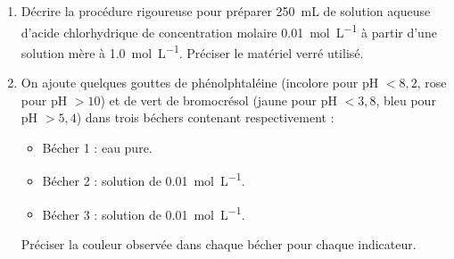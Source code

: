 \documentclass[11pt]{article}
\begin{document}
\begin{exercice}
\begin{enumerate}
    \item Décrire la procédure rigoureuse pour préparer \SI{250}{\milli\liter} de solution aqueuse d'acide chlorhydrique de concentration molaire \SI{0,01}{\mol\per\liter} à partir d'une solution mère à \SI{1,0}{\mol\per\liter}. Préciser le matériel verré utilisé.
    \item On ajoute quelques gouttes de phénolphtaléine (incolore pour pH $< 8,2$, rose pour pH $> 10$) et de vert de bromocrésol (jaune pour pH $< 3,8$, bleu pour pH $> 5,4$) dans trois béchers contenant respectivement :
    \begin{itemize}
        \item Bécher 1 : eau pure.
        \item Bécher 2 : solution de  \SI{0,01}{\mol\per\liter}.
        \item Bécher 3 : solution de  \SI{0,01}{\mol\per\liter}.
    \end{itemize}
    Préciser la couleur observée dans chaque bécher pour chaque indicateur.
\end{enumerate}
\end{exercice}
\end{document}
